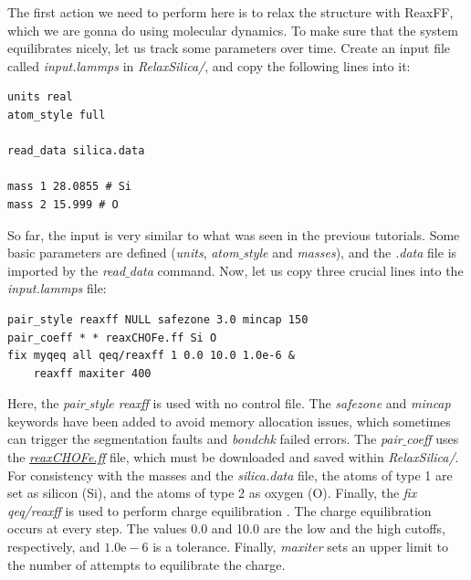 \documentclass[9pt,tutorial]{livecoms}
\begin{document}
The first action we need to perform here is to relax the structure with ReaxFF, which we are gonna do using molecular dynamics. To make sure that the system equilibrates nicely, let us track some parameters over time. Create an input file called \textit{input.lammps} in \textit{RelaxSilica/}, and copy the following lines into it: 
{\normalsize \begin{verbatim}
units real
atom_style full

read_data silica.data

mass 1 28.0855 # Si
mass 2 15.999 # O
\end{verbatim}}
So far, the input is very similar to what was seen in the previous tutorials. Some basic parameters are defined (\textit{units}, \textit{atom$\_$style} and \textit{masses}), and the \textit{.data} file is imported by the \textit{read$\_$data} command. Now, let us copy three crucial lines into the \textit{input.lammps} file:
{\normalsize \begin{verbatim}
pair_style reaxff NULL safezone 3.0 mincap 150
pair_coeff * * reaxCHOFe.ff Si O
fix myqeq all qeq/reaxff 1 0.0 10.0 1.0e-6 &
    reaxff maxiter 400
\end{verbatim}}
Here, the \textit{pair$\_$style reaxff} is used with no control file. The \textit{safezone} and \textit{mincap} keywords have been added to avoid memory allocation issues, which sometimes can trigger the segmentation faults and \textit{bondchk} failed errors. The \textit{pair$\_$coeff} uses the \href{https://raw.githubusercontent.com/lammpstutorials/lammpstutorials-article/main/files/tutorial5/reaxCHOFe.ff}{\textit{reaxCHOFe.ff}} file, which must be downloaded and saved within \textit{RelaxSilica/}. For consistency with the masses and the \textit{silica.data} file, the atoms of type 1 are set as silicon (Si), and the atoms of type 2 as oxygen (O). Finally, the \textit{fix qeq/reaxff} is used to perform charge equilibration \cite{rappe1991charge}. The charge equilibration occurs at every step. The values 0.0 and 10.0 are the low and the high cutoffs, respectively, and $1.0 \text{e} -6$ is a tolerance. Finally, \textit{maxiter} sets an upper limit to the number of attempts to equilibrate the charge. 
\end{document}
